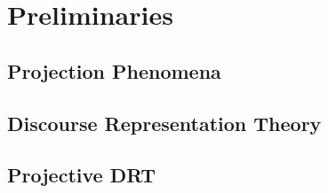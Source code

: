 \section{Preliminaries}

\subsection{Projection Phenomena}

\subsection{Discourse Representation Theory}

\subsection{Projective DRT}
